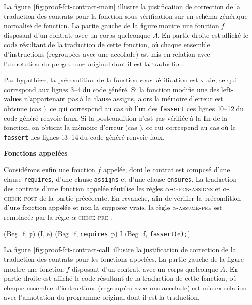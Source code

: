 La figure~\ref{fig:proof-fct-contract-main} illustre la justification de
correction de la traduction des contrats pour la fonction sous vérification sur
un schéma générique normalisé de fonction.
La partie gauche de la figure montre une fonction $f$ disposant d'un
contrat, avec un corps quelconque $A$.
En partie droite est affiché le code résultant de la traduction de cette
fonction, où chaque ensemble d'instructions (regroupées avec une accolade) est
mis en relation avec l'annotation du programme original dont il est la
traduction.

Par hypothèse, la précondition de la fonction sous vérification est vraie, ce
qui correspond aux lignes 3--4 du code généré.
Si la fonction modifie une des left-values n'appartenant pas à la clause
assigns, alors la mémoire d'erreur est obtenue (cas ), ce qui
correspond au cas où l'un des \lstinline'fassert' des lignes 10--12 du code
généré renvoie faux.
Si la postcondition n'est pas vérifiée à la fin de la fonction, on obtient
la mémoire d'erreur (cas ), ce qui correspond au cas où le
\lstinline'fassert' des lignes 13--14 du code généré renvoie faux.


\textbf{Fonctions appelées}



Considérons enfin une fonction $f$ appelée, dont le contrat est
composé d'une clause \lstinline'requires', d'une clause \lstinline'assigns' et
d'une clause \lstinline'ensures'.
La traduction des contrats d'une fonction appelée réutilise les règles
\textsc{$\alpha$-check-assigns} et \textsc{$\alpha$-check-post} de la partie
précédente.
En revanche, afin de vérifier la précondition d'une fonction appelée et non la
supposer vraie, la règle \textsc{$\alpha$-assume-pre} est remplacée par la règle
\textsc{$\alpha$-check-pre} :

{\scriptsize
  {
    {(Beg_f, p) \prule (I, e)}
    {(Beg_f, \mbox{\lstinline'requires'}~p\semicolon)
      \arule
      I \concat (Beg_f, \mbox{\lstinline'fassert('}e\mbox{\lstinline');'})
    }{}
  }
}

La figure~\ref{fig:proof-fct-contract-call} illustre la justification de
correction de la traduction des contrats pour les fonctions appelées.
La partie gauche de la figure montre une fonction $f$ disposant d'un
contrat, avec un corps quelconque $A$.
En partie droite est affiché le code résultant de la traduction de cette
fonction, où chaque ensemble d'instructions (regroupées avec une accolade) est
mis en relation avec l'annotation du programme original dont il est la
traduction.

